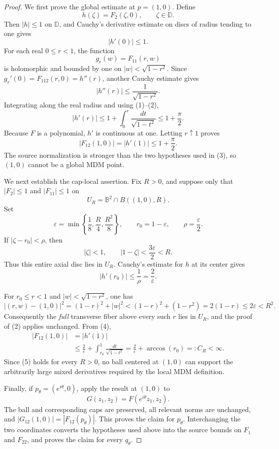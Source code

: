 \documentclass[11pt]{article}
\newcommand{\B}{\mathbb B}
\newcommand{\D}{\mathbb D}
\begin{document}
\begin{proof}
We first prove the global estimate at \(p=(1,0)\).  Define
\[
 h(\zeta)=F_2(\zeta,0),\qquad \zeta\in\D.
\]
Then \(|h|\le1\) on \(\D\), and Cauchy's derivative estimate on discs of
radius tending to one gives
\[
 |h'(0)|\le1. \tag{1}
\]
For each real \(0\le r<1\), the function
\[
 g_r(w)=F_{11}(r,w)
\]
is holomorphic and bounded by one on
\(|w|<\sqrt{1-r^2}\).  Since
\(g_r'(0)=F_{112}(r,0)=h''(r)\), another Cauchy estimate gives
\[
 |h''(r)|\le \frac1{\sqrt{1-r^2}}. \tag{2}
\]
Integrating along the real radius and using (1)--(2),
\[
 |h'(r)|
 \le 1+\int_0^r\frac{dt}{\sqrt{1-t^2}}
 \le 1+\frac\pi2.
\]
Because \(F\) is a polynomial, \(h'\) is continuous at one.  Letting
\(r\uparrow1\) proves
\[
 |F_{12}(1,0)|=|h'(1)|\le1+\frac\pi2. \tag{3}
\]
The source normalization is stronger than the two hypotheses used in (3), so
\((1,0)\) cannot be a global MDM point.

We next establish the cap-local assertion.  Fix \(R>0\), and suppose only
that \(|F_2|\le1\) and \(|F_{11}|\le1\) on
\[
 U_R=\B^2\cap B((1,0),R).
\]
Set
\[
 \varepsilon=\min\left\{\frac18,\frac R4,\frac{R^2}{8}\right\},
 \qquad r_0=1-\varepsilon,
 \qquad \rho=\frac\varepsilon2.
\]
If \(|\zeta-r_0|<\rho\), then
\[
 |\zeta|<1,
 \qquad
 |1-\zeta|<\frac{3\varepsilon}{2}<R.
\]
Thus this entire axial disc lies in \(U_R\).  Cauchy's estimate for \(h\) at
its center gives
\[
 |h'(r_0)|\le\frac1\rho=\frac2\varepsilon. \tag{4}
\]

For \(r_0\le r<1\) and \(|w|<\sqrt{1-r^2}\), one has
\[
 |(r,w)-(1,0)|^2
 =(1-r)^2+|w|^2
 <(1-r)^2+(1-r^2)
 =2(1-r)
 \le2\varepsilon<R^2.
\]
Consequently the \emph{full} transverse fiber above every such \(r\) lies in
\(U_R\), and the proof of (2) applies unchanged.  From (4),
\begin{equation}
 \begin{aligned}
 |F_{12}(1,0)|
  &=|h'(1)|\\
  &\le \frac2\varepsilon+
    \int_{r_0}^1\frac{dt}{\sqrt{1-t^2}}
   =\frac2\varepsilon+\arccos(r_0)=:C_R<\infty.
 \end{aligned}
 \tag{5}
\end{equation}
Since (5) holds for every \(R>0\), no ball centered at \((1,0)\) can support
the arbitrarily large mixed derivatives required by the local MDM definition.

Finally, if \(p_\theta=(e^{i\theta},0)\), apply the result at \((1,0)\) to
\[
 G(z_1,z_2)=F(e^{i\theta}z_1,z_2).
\]
The ball and corresponding caps are preserved, all relevant norms are
unchanged, and \(|G_{12}(1,0)|=|F_{12}(p_\theta)|\).  This proves the claim for
\(p_\theta\).  Interchanging the two coordinates converts the hypotheses used
above into the source bounds on \(F_1\) and \(F_{22}\), and proves the claim
for every \(q_\theta\).
\end{proof}
\end{document}
